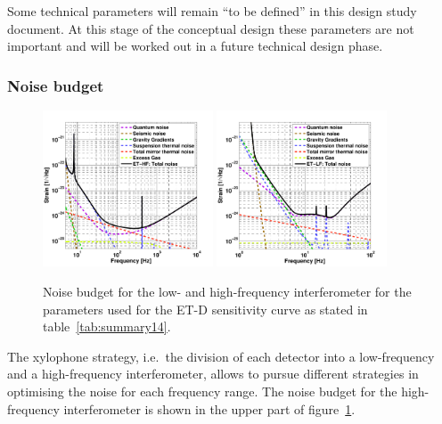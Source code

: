 Some technical parameters will remain ``to be defined'' in this design study 
document. At this stage of the conceptual design these parameters are not 
important and will be worked out in a future technical design phase.

\subsubsection{\label{Noisebudget}Noise budget}

\begin{figure}
  \begin{center}
\vskip -0.3cm
    \includegraphics[width=0.45\textwidth]{Sec_Introduction/ETD_HF3.pdf}
%  
\vskip 0.4cm
    \includegraphics[width=0.45\textwidth]{Sec_Introduction/ETD_LF3.pdf}
    \caption{Noise budget for the low- and high-frequency interferometer for the 
    parameters used for the ET-D sensitivity curve as stated in table~\ref{tab:summary14}.}
    \label{fig:noise_budget}
    \vspace{-0.7cm}
  \end{center}
\end{figure}

The xylophone strategy, i.e.\ the division of each detector into a low-frequency 
and a high-frequency interferometer, allows to pursue different strategies in 
optimising the noise for each frequency range. The noise budget for the 
high-frequency interferometer is shown in the upper part of figure~\ref{fig:noise_budget}. 


